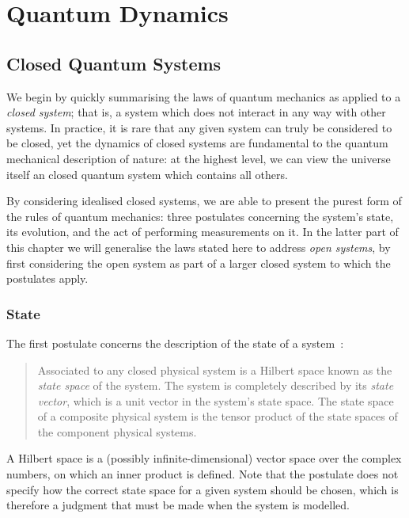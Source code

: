 \chapter{Quantum Dynamics} 
\label{ch:QuantumDynamics}

\section{Closed Quantum Systems}

We begin by quickly summarising the laws of quantum mechanics as applied to a \textit{closed system}; that is, a system which does not interact in any way with other systems. In practice, it is rare that any given system can truly be considered to be closed, yet the dynamics of closed systems are fundamental to the quantum mechanical description of nature: at the highest level, we can view the universe itself an closed quantum system which contains all others.

By considering idealised closed systems, we are able to present the purest form of the rules of quantum mechanics: three postulates concerning the system's state, its evolution, and the act of performing measurements on it. In the latter part of this chapter we will generalise the laws stated here to address \textit{open systems}, by first considering the open system as part of a larger closed system to which the postulates apply.

\subsection{State}

The first postulate concerns the description of the state of a system~\cite{nielsen+chuang}:
\begin{quotation}
  Associated to any closed physical system is a Hilbert space known as the \textit{state space} of the system. The system is completely described by its \textit{state vector}, which is a unit vector in the system's state space. The state space of a composite physical system is the tensor product of the state spaces of the component physical systems.
\end{quotation}
A Hilbert space is a (possibly infinite-dimensional) vector space over the complex numbers, on which an inner product is defined. Note that the postulate does not specify how the correct state space for a given system should be chosen, which is therefore a judgment that must be made when the system is modelled.

